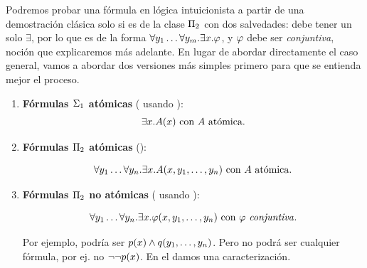 Podremos probar una fórmula en lógica intuicionista a partir de una demostración clásica solo si es de la clase $\Pi_{2}$ con dos salvedades: debe tener un solo $\exists$, por lo que es de la forma $\forall y_1 \dots \forall y_m . \exists x . \varphi$, y $\varphi$ debe ser \textit{conjuntiva}, noción que explicaremos más adelante. En lugar de abordar directamente el caso general, vamos a abordar dos versiones más simples primero para que se entienda mejor el proceso.

\begin{enumerate}
    \item \textbf{Fórmulas $\Sigma_{1}$ atómicas} ( usando ):
          \[
              \exists x . A(x) \text{ con } A \text{ atómica.}
          \]
    \item \textbf{Fórmulas $\Pi_{2}$ atómicas} ():

          \[
              \forall y_1 \dots \forall y_n . \exists x . A(x, y_1, \dots, y_n) \text{ con } A \text{ atómica}.
          \]

    \item \textbf{Fórmulas $\Pi_{2}$ no atómicas} ( usando ):

          \[
              \forall y_1 \dots \forall y_n . \exists x . \varphi(x, y_1, \dots, y_n) \text{ con } \varphi \text{\textit{ conjuntiva}}.
          \]

          Por ejemplo, podría ser $p(x) \wedge q(y_1, \dots, y_n)$.
          Pero no podrá ser cualquier fórmula, por ej. no $\neg \neg p(x)$. En el  damos una caracterización.
\end{enumerate}


